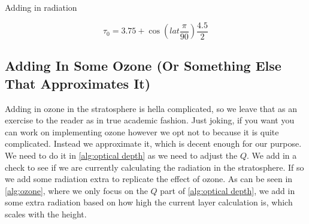 \begin{algorithm}
    \caption{Adding in radiation}
    \label{alg:optical depth}
\end{algorithm}

\begin{equation}
    \tau_0 = 3.75 + \cos(lat \frac{\pi}{90})\frac{4.5}{2}
    \label{eq:optical depth surface}
\end{equation}

\subsection{Adding In Some Ozone (Or Something Else That Approximates It)}
Adding in ozone in the stratosphere is hella complicated, so we leave that as an exercise to the reader as in true academic fashion. Just joking, if you want you can work on implementing ozone 
however we opt not to because it is quite complicated. Instead we approximate it, which is decent enough for our purpose. We need to do it in \autoref{alg:optical depth} as we need to adjust the
$Q$. We add in a check to see if we are currently calculating the radiation in the stratosphere. If so we add some radiation extra to replicate the effect of ozone. As can be seen in 
\autoref{alg:ozone}, where we only focus on the $Q$ part of \autoref{alg:optical depth}, we add in some extra radiation based on how high the current layer calculation is, which scales with the
height. 

